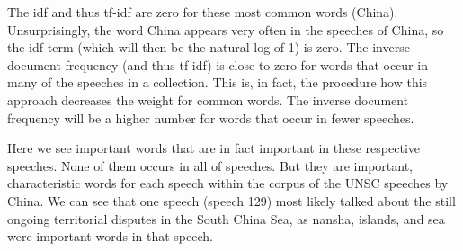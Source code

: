 \documentclass[
]{article}
\begin{document}
The idf and thus tf-idf are zero for these most common words (China).
Unsurprisingly, the word China appears very often in the speeches of
China, so the idf-term (which will then be the natural log of 1) is
zero. The inverse document frequency (and thus tf-idf) is close to zero
for words that occur in many of the speeches in a collection. This is,
in fact, the procedure how this approach decreases the weight for common
words. The inverse document frequency will be a higher number for words
that occur in fewer speeches.

Here we see important words that are in fact important in these
respective speeches. None of them occurs in all of speeches. But they
are important, characteristic words for each speech within the corpus of
the UNSC speeches by China. We can see that one speech (speech 129) most
likely talked about the still ongoing territorial disputes in the South
China Sea, as nansha, islands, and sea were important words in that
speech.
\end{document}

